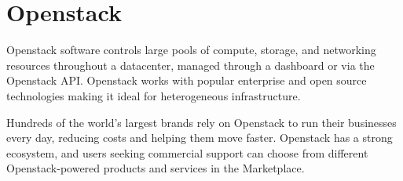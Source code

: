 
\section{Openstack}
Openstack software controls large pools of compute, storage, and networking
resources throughout a datacenter, managed through a dashboard or via the
Openstack API. Openstack works with popular enterprise and open source
technologies making it ideal for heterogeneous infrastructure.

Hundreds of the world’s largest brands rely on Openstack to run their
businesses every day, reducing costs and helping them move faster. Openstack
has a strong ecosystem, and users seeking commercial support can choose from
different Openstack-powered products and services in the Marketplace.
\cite{Openstack}

